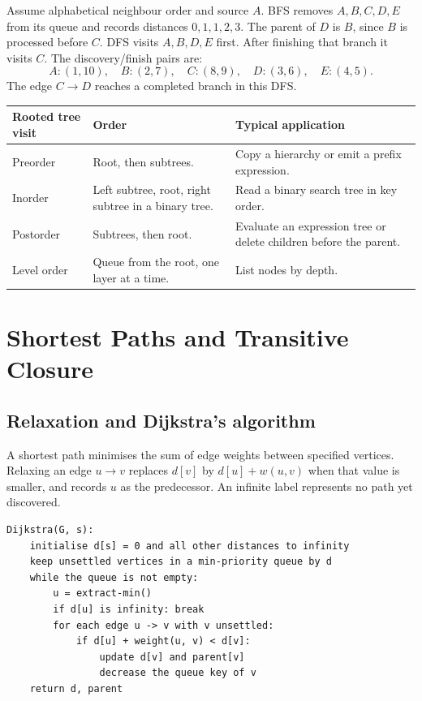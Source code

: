 \documentclass[12pt,a4paper]{article}
\begin{document}
\begin{tcolorbox}[examplebox, title={BFS levels and DFS times}]
Assume alphabetical neighbour order and source $A$. BFS removes $A,B,C,D,E$ from its queue and records distances $0,1,1,2,3$. The parent of $D$ is $B$, since $B$ is processed before $C$. DFS visits $A,B,D,E$ first. After finishing that branch it visits $C$. The discovery/finish pairs are:
\[
A:(1,10),\quad B:(2,7),\quad C:(8,9),\quad D:(3,6),\quad E:(4,5).
\]
The edge $C\to D$ reaches a completed branch in this DFS.
\end{tcolorbox}

\par\vspace{5pt}
\begingroup
\setlength{\extrarowheight}{1pt}
\noindent\begin{tabularx}{\linewidth}{|B{3.4cm}|Y|Y|}
\hline
\textbf{Rooted tree visit} & \textbf{Order} & \textbf{Typical application} \\ \hline
Preorder & Root, then subtrees. & Copy a hierarchy or emit a prefix expression. \\ \hline
Inorder & Left subtree, root, right subtree in a binary tree. & Read a binary search tree in key order. \\ \hline
Postorder & Subtrees, then root. & Evaluate an expression tree or delete children before the parent. \\ \hline
Level order & Queue from the root, one layer at a time. & List nodes by depth. \\ \hline
\end{tabularx}\par
\endgroup

\section{Shortest Paths and Transitive Closure}
\subsection{Relaxation and Dijkstra's algorithm}
\begin{tcolorbox}[defbox, title={Shortest path and relaxation}]
A shortest path minimises the sum of edge weights between specified vertices. Relaxing an edge $u\to v$ replaces $d[v]$ by $d[u]+w(u,v)$ when that value is smaller, and records $u$ as the predecessor. An infinite label represents no path yet discovered.
\end{tcolorbox}

\begin{tcolorbox}[formulabox, title={Dijkstra with a min-priority queue}]
\begin{verbatim}
Dijkstra(G, s):
    initialise d[s] = 0 and all other distances to infinity
    keep unsettled vertices in a min-priority queue by d
    while the queue is not empty:
        u = extract-min()
        if d[u] is infinity: break
        for each edge u -> v with v unsettled:
            if d[u] + weight(u, v) < d[v]:
                update d[v] and parent[v]
                decrease the queue key of v
    return d, parent
\end{verbatim}
\end{tcolorbox}
\end{document}
